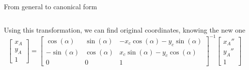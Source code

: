 \documentclass[aspectratio=169]{beamer}
\begin{document}
\begin{frame}[t]{From general to canonical form}
\begin{columns}[onlytextwidth]
Using this transformation, we can find original coordinates, knowing the new one
\begin{equation*} \begin{bmatrix}
x_A\\ y_A \\1
\end{bmatrix} = 
\begin{bmatrix}
\cos(\alpha) & \sin(\alpha) & -x_c\cos(\alpha)-y_c\sin(\alpha) \\ -\sin(\alpha) & \cos(\alpha) & x_c\sin(\alpha)-y_c\cos(\alpha) \\ 0 & 0 & 1
\end{bmatrix}^{-1} \begin{bmatrix}
{x}_A''\\{y}_A''\\1
\end{bmatrix}
\end{equation*}
\end{columns}
\end{frame}
\end{document}
